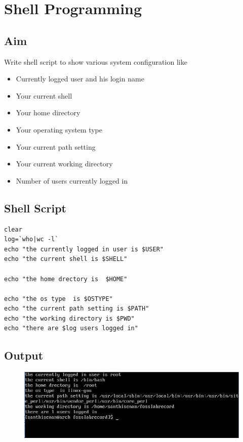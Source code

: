 \documentclass{article}
\begin{document}
\newpage

\section{Shell Programming}
\subsection{Aim}
Write shell script to show various system configuration like
\begin{itemize}
\item Currently logged user and his login name
\item Your current shell
\item Your home directory
\item Your operating system type
\item Your current path setting
\item Your current working directory
\item Number of users currently logged in
\end{itemize}

\subsection{Shell Script}
\begin{verbatim}
clear
log=`who|wc -l`
echo "the currently logged in user is $USER"
echo "the current shell is $SHELL"

echo "the home drectory is  $HOME"

echo "the os type  is $OSTYPE"
echo "the current path setting is $PATH"
echo "the working directory is $PWD"
echo "there are $log users logged in"
\end{verbatim}

\subsection{Output}
\begin{figure}[h!]
	\includegraphics[width=\linewidth]{./outputs/exp3new.jpg}
\end{figure}
\end{document}
